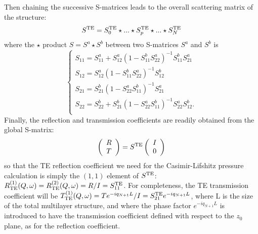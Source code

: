 \documentclass[aps,pra,superscriptaddress,amsmath,amssymb,showpacs,twocolumn,notitlepage]{revtex4-1}
\begin{document}
Then chaining the successive S-matrices leads to the overall scattering matrix of the structure:
\begin{equation} \label{Eq:Chain} 
S^{\rm{TE}}=S_0^{\rm{TE}}\star...\star S_p^{\rm{TE}}\star...\star S_{N}^{\rm{TE}}
\end{equation}
where the $\star$ product $S=S^a\star S^b$ between two S-matrices $S^a$ and $S^b$ is
%
\begin{equation}  \label{Eq:ChainStar}
\left\{ \begin{array}{llll}
S_{11}=  S^a_{11}+S^a_{12}(1-S^b_{11}S^a_{22})^{-1}S^b_{11}S^a_{21}\\
S_{12}=  S^a_{12}(1-S^b_{11}S^a_{22})^{-1}S^b_{12}\\
S_{21}=  S^b_{21}(1-S^a_{22}S^b_{11})^{-1}S^a_{21}  \\
S_{22}=  S^b_{22}+S^b_{21}(1-S^a_{22}S^b_{11})^{-1}S^a_{22}S^b_{12}. \\
\end{array} \right.  
\end{equation}
\vspace{0.2cm}
%
Finally, the reflection and transmission coefficients are readily obtained from the global S-matrix:
%
\begin{equation} \label{Eq:Smat_coefs}
\left(\begin{array}{c}  R  \\ T \end{array} \right) = S^{\rm{TE}} \left(\begin{array}{c}  I  \\  0 \end{array} \right)
\end{equation}
so that the TE reflection coefficient we need for the Casimir-Lifshitz pressure calculation is simply the $(1,1)$ element of  $S^{\rm{TE}}$: $R_{\rm{TE}}^{(1)}(Q,\omega)=R_{\rm{TE}}^{(2)}(Q,\omega)=R/I=S_{11}^{\rm{TE}}$. {For completeness, the TE transmission coefficient will be $T_{\rm{TE}}^{(1)}(Q,\omega)=Te^{-iq_{N+1}L}/I=S_{21}^{\rm{TE}}e^{-iq_{N+1}L}$, where L is the size of the total multilayer structure, and where the phase factor $e^{-iq_{N+1}L}$ is introduced to have the transmission coefficient defined with respect to the $z_0$ plane, as for the reflection coefficient.} 
\end{document}
